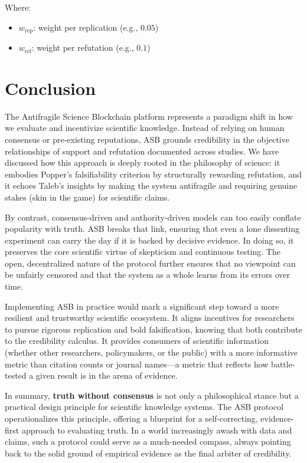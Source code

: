 \documentclass{article}
\begin{document}
Where:
\begin{itemize}
	\item $w_{\text{rep}}$: weight per replication (e.g., $0.05$)
	\item $w_{\text{ref}}$: weight per refutation (e.g., $0.1$)
\end{itemize}


\section{Conclusion}
The Antifragile Science Blockchain platform represents a paradigm shift in how we evaluate and incentivize scientific knowledge. Instead of relying on human consensus or pre-existing reputations, ASB grounds credibility in the objective relationships of support and refutation documented across studies. We have discussed how this approach is deeply rooted in the philosophy of science: it embodies Popper's falsifiability criterion by structurally rewarding refutation, and it echoes Taleb's insights by making the system antifragile and requiring genuine stakes (skin in the game) for scientific claims. 

By contrast, consensus-driven and authority-driven models can too easily conflate popularity with truth. ASB breaks that link, ensuring that even a lone dissenting experiment can carry the day if it is backed by decisive evidence. In doing so, it preserves the core scientific virtue of skepticism and continuous testing. The open, decentralized nature of the protocol further ensures that no viewpoint can be unfairly censored and that the system as a whole learns from its errors over time.

Implementing ASB in practice would mark a significant step toward a more resilient and trustworthy scientific ecosystem. It aligns incentives for researchers to pursue rigorous replication and bold falsification, knowing that both contribute to the credibility calculus. It provides consumers of scientific information (whether other researchers, policymakers, or the public) with a more informative metric than citation counts or journal names—a metric that reflects how battle-tested a given result is in the arena of evidence.

In summary, \textbf{truth without consensus} is not only a philosophical stance but a practical design principle for scientific knowledge systems. The ASB protocol operationalizes this principle, offering a blueprint for a self-correcting, evidence-first approach to evaluating truth. In a world increasingly awash with data and claims, such a protocol could serve as a much-needed compass, always pointing back to the solid ground of empirical evidence as the final arbiter of credibility.




\end{document}

